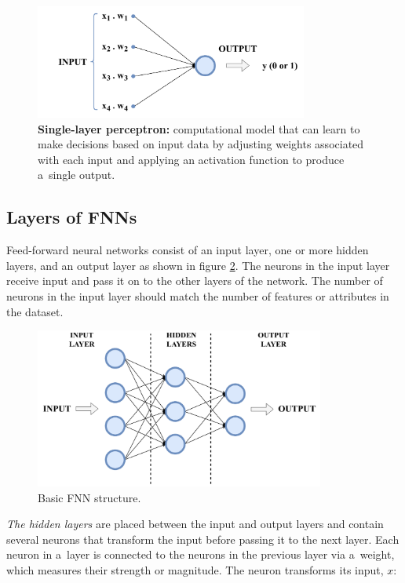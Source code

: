     \begin{figure}[ht!]
        \centering
        \includegraphics[width = 0.8\textwidth]{obrazky-figures/perceptron.pdf}
        \caption{\textbf{Single-layer perceptron:} computational model that can learn to make decisions based on input data by adjusting weights associated with each input and applying an activation function to produce a~single output.}
        \label{fig:perceptron}
    \end{figure}

\subsection{Layers of FNNs}

Feed-forward neural networks consist of an input layer, one or more hidden layers, and an output layer as shown in figure \ref{fig:layers}. The neurons in the input layer receive input and pass it on to the other layers of the network. The number of neurons in the input layer should match the number of features or attributes in the dataset.

    \begin{figure}[ht!]
        \centering
        \includegraphics[width = 0.85\textwidth]{obrazky-figures/layers.pdf}
        \caption{Basic FNN structure.}
        \label{fig:layers}
    \end{figure}

\textit{The hidden layers} are placed between the input and output layers and contain several neurons that transform the input before passing it to the next layer. Each neuron in a~layer is connected to the neurons in the previous layer via a~weight, which measures their strength or magnitude. The neuron transforms its input, $x$:

